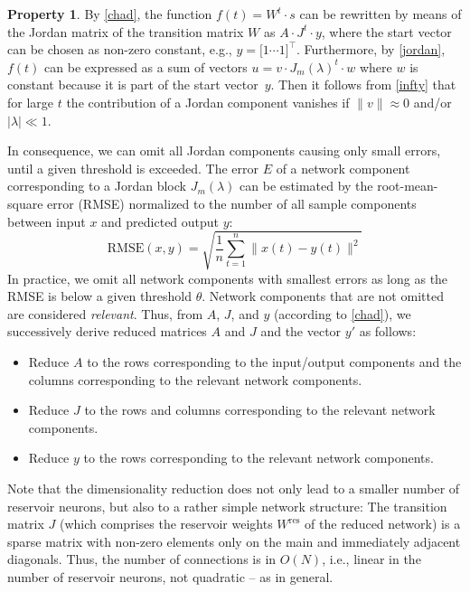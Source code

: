\documentclass[twoside,11pt]{article}
\theoremstyle{definition}
\newtheorem{prop}{Property}
\begin{document}
\begin{prop}
By \cref{chad}, the function $f(t) = W^t \cdot s$ can be rewritten by
means of the Jordan matrix of the transition matrix $W$ as $A \cdot J^t
\cdot y$, where the start vector can be chosen as non-zero constant, e.g., $y =
\big[ 1 \cdots 1 \big]^\top$. Furthermore, by \cref{jordan}, $f(t)$ can be
expressed as a sum of vectors $u = v \cdot J_m(\lambda)^t \cdot w$ where $w$ is
constant because it is part of the start vector~$y$. Then it follows from
\cref{infty} that for large $t$ the contribution of a Jordan component
vanishes if $\|v\| \approx 0$ and/or $|\lambda| \ll 1$.

In consequence, we can omit all Jordan components causing only small errors,
until a given threshold is exceeded. The error $E$ of a network component
corresponding to a Jordan block $J_m(\lambda)$ can be estimated by the
root-mean-square error (RMSE) normalized to the number of all sample components
between input $x$ and predicted output $y$:
  \[ \mathrm{RMSE}(x,y) = \sqrt{\frac{1}{n} \sum_{t=1}^n \big\|x(t)-y(t)\big\|^2} \]
In practice, we omit all network components with smallest errors as long as the
RMSE is below a given threshold $\theta$. Network components that are not
omitted are considered \emph{relevant}. Thus, from $A$, $J$, and
$y$ (according to \cref{chad}), we successively derive reduced matrices
$A$ and $J$ and the vector $y'$ as follows:
\begin{itemize}
  \item Reduce $A$ to the rows corresponding to the input/output components and
	the columns corresponding to the relevant network components.
  \item Reduce $J$ to the rows and columns corresponding to the relevant
	network components.
  \item Reduce $y$ to the rows corresponding to the relevant network components.
\end{itemize}
\end{prop}

Note that the dimensionality reduction does not only lead to a smaller number of
reservoir neurons, but also to a rather simple network structure: The transition
matrix $J$ (which comprises the reservoir weights $W^\mathrm{res}$ of
the reduced network) is a sparse matrix with non-zero elements only on the main
and immediately adjacent diagonals. Thus, the number of connections is in
$O(N)$, i.e., linear in the number of reservoir neurons, not quadratic -- as in
general.
\end{document}
